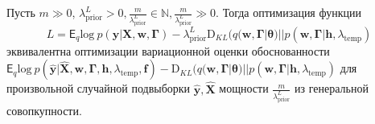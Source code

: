 \begin{theorem}
Пусть $m \gg 0$, ${\lambda_\text{prior}^L} > 0, \frac{m}{\lambda_\text{prior}^L}   \in \mathbb{N}, \frac{m}{\lambda_\text{prior}^L}  \gg 0.$ Тогда оптимизация функции
\[
L = 
{\mathsf{E}_q \text{log}~{p(\mathbf{y} | \mathbf{X}, \mathbf{w}, \boldsymbol{\Gamma})}}-{\lambda_\text{prior}^L \text{D}_{KL}(q(\mathbf{w}, \boldsymbol{\Gamma}|\boldsymbol{\theta})||p(\mathbf{w}, \boldsymbol{\Gamma} |\mathbf{h}, \lambda_{\text{temp}})}
\] эквивалентна оптимизации вариационной оценки обоснованности  $\mathsf{E}_q \text{log}~{p(\hat{\mathbf{y}} | \hat{\mathbf{X}}, \mathbf{w}, \boldsymbol{\Gamma}, \mathbf{h}, \lambda_{\text{temp}},\mathbf{f})} - \text{D}_{KL}(q(\mathbf{w}, \boldsymbol{\Gamma}|\boldsymbol{\theta})||p(\mathbf{w}, \boldsymbol{\Gamma} |\mathbf{h}, \lambda_{\text{temp}})$
для произвольной случайной подвыборки $\hat{\mathbf{y}}, \hat{\mathbf{X}}$ мощности $\frac{m}{{\lambda_\text{prior}^L}}$ из генеральной совопкупности.
\end{theorem}
